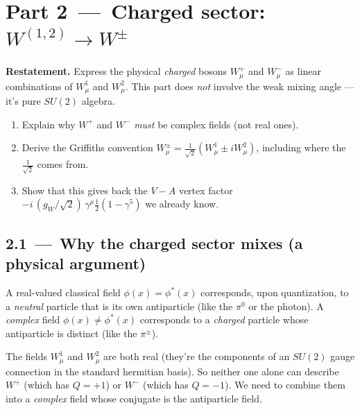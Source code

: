 \documentclass[11pt]{article}
\begin{document}
\newpage

\section*{Part 2 \,---\, Charged sector: $W^{(1,2)} \to W^{\pm}$}

\begin{problembox}
\textbf{Restatement.} Express the physical \emph{charged} bosons $W^+_\mu$ and $W^-_\mu$ as
linear combinations of $W^1_\mu$ and $W^2_\mu$. This part does \emph{not} involve the
weak mixing angle --- it's pure $SU(2)$ algebra.
\end{problembox}

\begin{deliverbox}
\begin{enumerate}[leftmargin=*]
  \item Explain why $W^+$ and $W^-$ \emph{must} be complex fields (not real ones).
  \item Derive the Griffiths convention $W^\pm_\mu = \tfrac{1}{\sqrt2}(W^1_\mu \pm i W^2_\mu)$,
        including where the $\tfrac{1}{\sqrt2}$ comes from.
  \item Show that this gives back the $V-A$ vertex factor $-i\,(g_W/\sqrt2)\,\gamma^\mu \tfrac{1}{2}(1-\gamma^5)$
        we already know.
\end{enumerate}
\end{deliverbox}

\subsection*{2.1 \,---\, Why the charged sector mixes (a physical argument)}

\begin{stepbox}[title=Step 2.1: Two real fields cannot represent a charged particle]
A real-valued classical field $\phi(x) = \phi^*(x)$ corresponds, upon quantization, to a
\emph{neutral} particle that is its own antiparticle (like the $\pi^0$ or the photon). A
\emph{complex} field $\phi(x) \neq \phi^*(x)$ corresponds to a \emph{charged} particle whose
antiparticle is distinct (like the $\pi^\pm$).

The fields $W^1_\mu$ and $W^2_\mu$ are both real (they're the components of an $SU(2)$
gauge connection in the standard hermitian basis). So neither one alone can describe
$W^+$ (which has $Q = +1$) or $W^-$ (which has $Q = -1$). We need to combine them into
a \emph{complex} field whose conjugate is the antiparticle field.
\end{stepbox}
\end{document}
